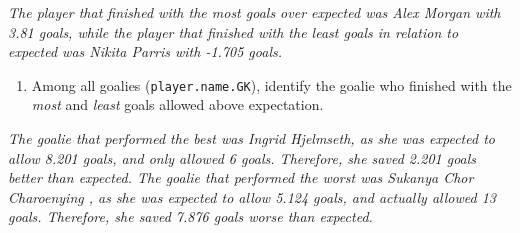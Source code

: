 \documentclass[]{article}
\newenvironment{Shaded}{\begin{snugshade}}{\end{snugshade}}
\newcommand{\DataTypeTok}[1]{\textcolor[rgb]{0.13,0.29,0.53}{#1}}
\newcommand{\KeywordTok}[1]{\textcolor[rgb]{0.13,0.29,0.53}{\textbf{#1}}}
\newcommand{\NormalTok}[1]{#1}
\newcommand{\OperatorTok}[1]{\textcolor[rgb]{0.81,0.36,0.00}{\textbf{#1}}}
\newcommand{\StringTok}[1]{\textcolor[rgb]{0.31,0.60,0.02}{#1}}
\providecommand{\tightlist}{%
  \setlength{\itemsep}{0pt}\setlength{\parskip}{0pt}}
\begin{document}
\begin{Shaded}
\end{Shaded}

\emph{The player that finished with the most goals over expected was
Alex Morgan with 3.81 goals, while the player that finished with the
least goals in relation to expected was Nikita Parris with -1.705
goals.}

\begin{enumerate}
\def\labelenumi{\arabic{enumi}.}
\setcounter{enumi}{9}
\tightlist
\item
  Among all goalies (\texttt{player.name.GK}), identify the goalie who
  finished with the \emph{most} and \emph{least} goals allowed above
  expectation.
\end{enumerate}

\begin{Shaded}
\end{Shaded}

\emph{The goalie that performed the best was Ingrid Hjelmseth, as she
was expected to allow 8.201 goals, and only allowed 6 goals. Therefore,
she saved 2.201 goals better than expected. The goalie that performed
the worst was Sukanya Chor Charoenying , as she was expected to allow
5.124 goals, and actually allowed 13 goals. Therefore, she saved 7.876
goals worse than expected.}
\end{document}

